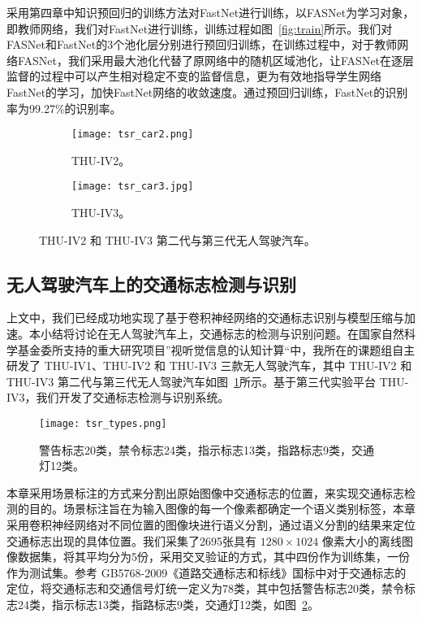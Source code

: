 采用第四章中知识预回归的训练方法对FastNet进行训练，以FASNet为学习对象，即教师网络，我们对FastNet进行训练，训练过程如图~\ref{fig:train}所示。我们对FASNet和FastNet的3个池化层分别进行预回归训练，在训练过程中，对于教师网络FASNet，我们采用最大池化代替了原网络中的随机区域池化，让FASNet在逐层监督的过程中可以产生相对稳定不变的监督信息，更为有效地指导学生网络FastNet的学习，加快FastNet网络的收敛速度。通过预回归训练，FastNet的识别率为99.27\%的识别率。

\begin{figure}[h]
  \centering%
  \begin{subfigure}{0.45\textwidth}
    \texttt{[image: tsr\_car2.png]}
    \caption{THU-IV2。}
  \end{subfigure}%
  \hspace{1em}%
  \begin{subfigure}{0.4\textwidth}
    \texttt{[image: tsr\_car3.jpg]}
    \caption{THU-IV3。}
  \end{subfigure}
  \caption{THU-IV2 和 THU-IV3 第二代与第三代无人驾驶汽车。}
  \label{fig:tsr_car}
\end{figure}

\subsection{无人驾驶汽车上的交通标志检测与识别}

上文中，我们已经成功地实现了基于卷积神经网络的交通标志识别与模型压缩与加速。本小结将讨论在无人驾驶汽车上，交通标志的检测与识别问题。在国家自然科学基金委所支持的重大研究项目”视听觉信息的认知计算“中，我所在的课题组自主研发了 THU-IV1、THU-IV2 和 THU-IV3 三款无人驾驶汽车，其中 THU-IV2 和 THU-IV3 第二代与第三代无人驾驶汽车如图~\ref{fig:tsr_car}所示。基于第三代实验平台 THU-IV3，我们开发了交通标志检测与识别系统。

\begin{figure}[b]
\centering
\texttt{[image: tsr\_types.png]}
\caption{警告标志20类，禁令标志24类，指示标志13类，指路标志9类，交通灯12类。}
\label{fig:tsr_types}
\end{figure}

本章采用场景标注的方式来分割出原始图像中交通标志的位置，来实现交通标志检测的目的。场景标注旨在为输入图像的每一个像素都确定一个语义类别标签，本章采用卷积神经网络对不同位置的图像块进行语义分割，通过语义分割的结果来定位交通标志出现的具体位置。我们采集了2695张具有 $1280\times1024$ 像素大小的离线图像数据集，将其平均分为5份，采用交叉验证的方式，其中四份作为训练集，一份作为测试集。参考 GB5768-2009《道路交通标志和标线》国标中对于交通标志的定位，将交通标志和交通信号灯统一定义为78类，其中包括警告标志20类，禁令标志24类，指示标志13类，指路标志9类，交通灯12类，如图~\ref{fig:tsr_types}。


